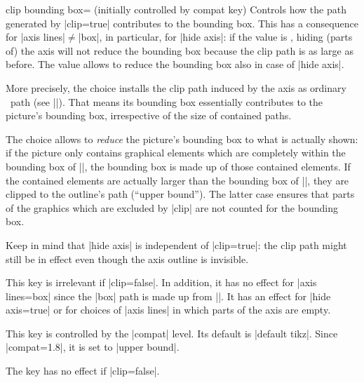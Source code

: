 \begin{pgfplotskey}{clip bounding box= (initially controlled by compat key)}
	Controls how the path generated by |clip=true| contributes to the bounding box. This has a consequence for |axis lines|$\neq$|box|, in particular, for |hide axis|: if the value is , hiding (parts of) the axis will not reduce the bounding box because the clip path is as large as before. The value  allows to reduce the bounding box also in case of |hide axis|. 

	More precisely, the choice  installs the clip path induced by the axis  as ordinary \tikzname\ path (see |\pgfplotspathaxisoutline|). That means its bounding box essentially contributes to the picture's bounding box, irrespective of the size of contained paths.

	The choice  allows to \emph{reduce} the picture's bounding box to what is actually shown: if the picture only contains graphical elements which are completely within the bounding box of |\pgfplotspathaxisoutline|, the bounding box is made up of those contained elements. If the contained elements are actually larger than the bounding box of |\pgfplotspathaxisoutline|, they are clipped to the outline's path (``upper bound''). The latter case ensures that parts of the graphics which are excluded by |clip| are not counted for the bounding box.

	Keep in mind that |hide axis| is independent of |clip=true|: the clip path might still be in effect even though the axis outline is invisible.

	This key is irrelevant if |clip=false|. In addition, it has no effect for |axis lines=box| since the |box| path is made up from |\pgfplotspathaxisoutline|. It has an effect for |hide axis=true| or for choices of |axis lines| in which parts of the axis are empty. 

	This key is controlled by the |compat| level. Its default is |default tikz|. Since |compat=1.8|, it is set to |upper bound|.

	The key has no effect if |clip=false|.
\end{pgfplotskey}
